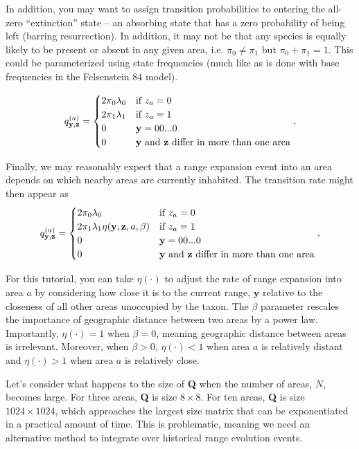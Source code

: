 \documentclass[11pt]{article}
\begin{document}
In addition, you may want to assign transition probabilities to entering the all-zero ``extinction'' state -- an absorbing state that has a zero probability of being left (barring resurrection). In addition, it may not be that any species is equally likely to be present or absent in any given area, i.e. $\pi_0 \neq \pi_1$ but $\pi_0 + \pi_1 = 1$. This could be parameterized using state frequencies (much like as is done with base frequencies in the Felsenstein 84 model).

\[
q^{(a)}_{\textbf{y},\textbf{z}} =
\begin{cases}
2 \pi_0 \lambda_0 & \text{if $z_a=0$}  \\
2 \pi_1 \lambda_1 & \text{if $z_a=1$} \\
0 & \mathbf{y} = 00...0 \\
0 & \text{\textbf{y} and \textbf{z} differ in more than one area}
\end{cases}.
\]

Finally, we may reasonably expect that a range expansion event into an area depends on which nearby areas are currently inhabited.
The transition rate might then appear as
\[
q^{(a)}_{\textbf{y},\textbf{z}} =
\begin{cases}
2 \pi_0 \lambda_0 & \text{if $z_a=0$}  \\
2 \pi_1 \lambda_1 \eta(\textbf{y}, \textbf{z}, a, \beta) & \text{if $z_a=1$} \\
0 & \mathbf{y} = 00...0 \\
0 & \text{\textbf{y} and \textbf{z} differ in more than one area}
\end{cases}.
\]

For this tutorial, you can take $\eta(\cdot)$ to adjust the rate of range expansion into area $a$ by considering how close it is to the current range, $\textbf{y}$ relative to the closeness of all other areas unoccupied by the taxon.
The $\beta$ parameter rescales the importance of geographic distance between two areas by a power law.
Importantly, $\eta(\cdot) = 1$ when $\beta=0$, meaning geographic distance between areas is irrelevant.
Moreover, when $\beta > 0$, $\eta(\cdot) < 1$ when area $a$ is relatively distant and $\eta(\cdot) > 1$ when area $a$ is relatively close.

Let's consider what happens to the size of \textbf{Q} when the number of areas, $N$, becomes large.
For three areas, \textbf{Q} is size $8 \times 8$.
For ten areas, \textbf{Q} is size $1024 \times 1024$, which approaches the largest size matrix that can be exponentiated in a practical amount of time.
This is problematic, meaning we need an alternative method to integrate over historical range evolution events.
\end{document}
